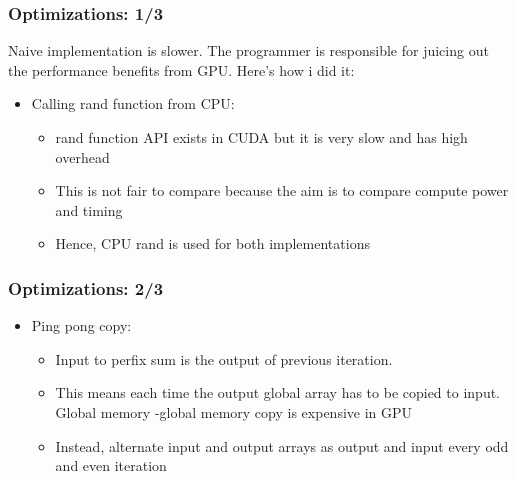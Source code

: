 \documentclass[mathserif]{beamer}
\begin{document}
\begin{frame}                                                                                                                                                                          
\frametitle{Optimizations: 1/3}
Naive implementation is slower. The programmer is responsible for juicing out the performance benefits from GPU. Here's how i did it:
\begin{itemize}
\item Calling rand function from CPU: 
\begin{itemize}
\item rand function API exists in CUDA but it is very slow and has high overhead
\item This is not fair to compare because the aim is to compare compute power and timing
\item Hence, CPU rand is used for both implementations 
\end{itemize}
\end{itemize}
\end{frame}              
\begin{frame}                                                                                                                                                                          
\frametitle{Optimizations: 2/3}
\begin{itemize}
\item Ping pong copy: 
\begin{itemize}
\item Input to perfix sum is the output of previous iteration.  
\item This means each time the output global array has to be copied to input. Global memory -global memory copy is expensive in GPU 
\item Instead, alternate input and output arrays as output and input every odd and even iteration 
\end{itemize}
\end{itemize}
\end{frame}              
\end{document}

